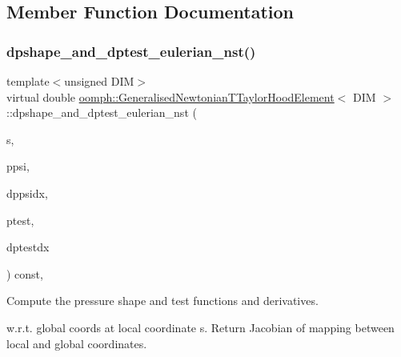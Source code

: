 \subsection{Member Function Documentation}
\mbox{\label{classoomph_1_1GeneralisedNewtonianTTaylorHoodElement_ac2f4d98477e957acde19e3753e334a8c}} 
\subsubsection{\texorpdfstring{dpshape\+\_\+and\+\_\+dptest\+\_\+eulerian\+\_\+nst()}{dpshape\_and\_dptest\_eulerian\_nst()}\hspace{0.1cm}{\footnotesize\ttfamily [1/3]}}
{\footnotesize\ttfamily template$<$unsigned D\+IM$>$ \\
virtual double \hyperlink{classoomph_1_1GeneralisedNewtonianTTaylorHoodElement}{oomph\+::\+Generalised\+Newtonian\+T\+Taylor\+Hood\+Element}$<$ D\+IM $>$\+::dpshape\+\_\+and\+\_\+dptest\+\_\+eulerian\+\_\+nst (\begin{DoxyParamCaption}\item[{const \hyperlink{classoomph_1_1Vector}{Vector}$<$ double $>$ \&}]{s,  }\item[{\hyperlink{classoomph_1_1Shape}{Shape} \&}]{ppsi,  }\item[{\hyperlink{classoomph_1_1DShape}{D\+Shape} \&}]{dppsidx,  }\item[{\hyperlink{classoomph_1_1Shape}{Shape} \&}]{ptest,  }\item[{\hyperlink{classoomph_1_1DShape}{D\+Shape} \&}]{dptestdx }\end{DoxyParamCaption}) const\hspace{0.3cm}{\ttfamily [protected]}, {\ttfamily [virtual]}}



Compute the pressure shape and test functions and derivatives. 

w.\+r.\+t. global coords at local coordinate s. Return Jacobian of mapping between local and global coordinates. 

